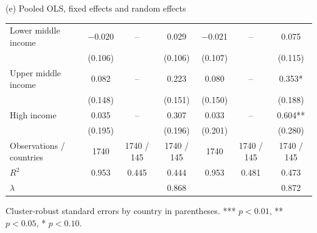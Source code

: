 \documentclass[10pt,aspectratio=169,t]{beamer}
\begin{document}
\begin{frame}{(e) Pooled OLS, fixed effects and random effects}
\begin{center}
\begin{tabular}{@{}l cccccc@{}}
\addlinespace[2pt]
Lower middle income     & $-$0.020 & -- & 0.029 & $-$0.021 & -- & 0.075 \\
                        & (0.106) & & (0.106) & (0.107) & & (0.115) \\
Upper middle income     & 0.082 & -- & 0.223 & 0.080 & -- & 0.353* \\
                        & (0.148) & & (0.151) & (0.150) & & (0.188) \\
High income             & 0.035 & -- & 0.307 & 0.033 & -- & 0.604** \\
                        & (0.195) & & (0.196) & (0.201) & & (0.280) \\
\midrule
Observations / countries & 1740 & 1740 / 145 & 1740 / 145 & 1740 & 1740 / 145 & 1740 / 145 \\
$R^2$                    & 0.953 & 0.445 & 0.444 & 0.953 & 0.481 & 0.473 \\
$\lambda$                & & & 0.868 & & & \alert{0.872} \\
\bottomrule
\end{tabular}
\end{center}
\vspace{0.2em}
{\scriptsize Cluster-robust standard errors by country in parentheses.
*** $p<0.01$, ** $p<0.05$, * $p<0.10$.}
\end{frame}
\end{document}

